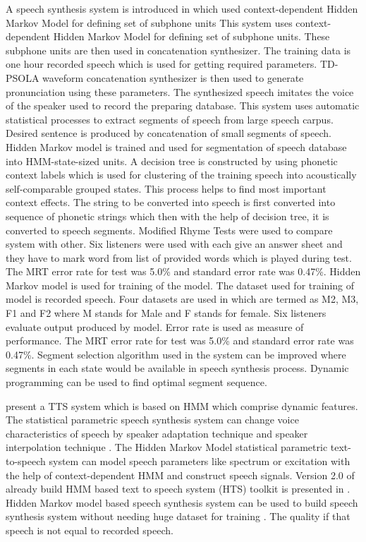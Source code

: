 A speech synthesis system is introduced in \cite{donovan1995improvements} which used context-dependent Hidden Markov Model
for defining set of subphone units This system uses context-dependent Hidden Markov Model for defining set of subphone units. These subphone units are then used in concatenation synthesizer. The training data is one hour recorded speech which is used for getting required parameters. TD-PSOLA waveform concatenation synthesizer is then used to generate pronunciation using these parameters. The synthesized speech imitates the voice of the speaker used to record the preparing database. This system uses automatic statistical processes to extract segments of speech from large speech carpus. Desired sentence is produced by concatenation of small
segments of speech. Hidden Markov model is trained and used for segmentation of speech database into HMM-state-sized
units. A decision tree is constructed by using phonetic context labels which is used for clustering of the training speech into
acoustically self-comparable grouped states. This process helps to find most important context effects. The string to be
converted into speech is first converted into sequence of phonetic strings which then with the help of decision tree, it is
converted to speech segments. Modified Rhyme Tests \cite{house1965articulation} were used to compare system
with other. Six listeners were used with each give an answer sheet and they have to mark word from list of provided words
which is played during test. The MRT error rate for test was 5.0\% and standard error rate was 0.47\%. Hidden Markov model is used for training of the model. The dataset used for training of model is recorded speech. Four datasets are used in which are termed as M2, M3, F1 and F2 where M stands for Male and F stands for female. Six listeners evaluate output produced by model. Error rate is used as measure of performance. 
The MRT error rate for test was 5.0\% and standard error rate was 0.47\%. Segment selection algorithm used in the system can be improved where segments in each state would be available in speech synthesis process. Dynamic programming can be used to find optimal segment sequence.

\cite{masuko1996speech} present a TTS system which is based on HMM which comprise dynamic features. The statistical parametric speech synthesis system can change voice characteristics of speech by speaker adaptation technique \cite{tamura1998speaker} and speaker interpolation technique \cite{yoshimura2001speaker}. The Hidden Markov Model statistical parametric text-to-speech system can model speech parameters like spectrum or excitation with the help of context-dependent HMM and construct speech signals. Version 2.0 of already build HMM based text to speech system (HTS) toolkit is presented in \cite{zen2007hmm}. Hidden Markov model based speech synthesis system can be used to build speech synthesis system without needing huge dataset for training \cite{huang2001spoken}. The quality if that speech is not equal to recorded speech. 

